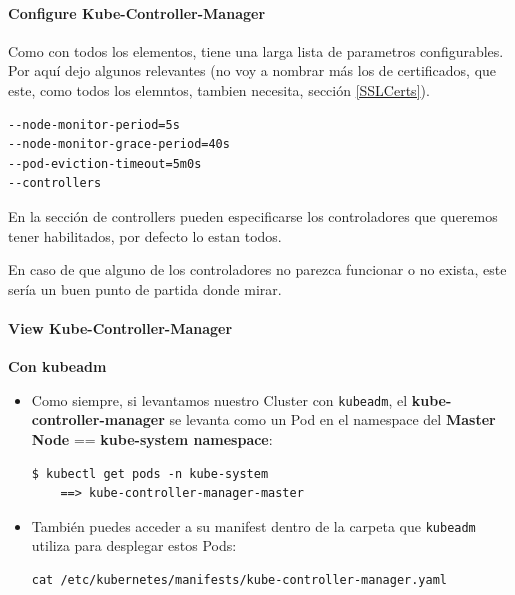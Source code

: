 \documentclass{article}
\newenvironment{codetemplate}[1][]{%
  \mybasecolorbox[#1]
  \itshape
}{%
  \endmybasecolorbox
}
\begin{document}
\paragraph{Configure Kube-Controller-Manager}

Como con todos los elementos, tiene una larga lista de parametros configurables. Por aquí dejo algunos relevantes (no voy a nombrar más los de certificados, que este, como todos los elemntos, tambien necesita, sección \ref{SSLCerts}).

\begin{codetemplate}{}
\begin{verbatim}
--node-monitor-period=5s
--node-monitor-grace-period=40s
--pod-eviction-timeout=5m0s
--controllers
\end{verbatim}
\end{codetemplate}

En la sección de controllers pueden especificarse los controladores que queremos tener habilitados, por defecto lo estan todos.

En caso de que alguno de los controladores no parezca funcionar o no exista, este sería un buen punto de partida donde mirar.

\paragraph{View Kube-Controller-Manager}

\textbf{Con kubeadm}

\begin{itemize}
    \item Como siempre, si levantamos nuestro Cluster con \verb|kubeadm|, el \textbf{kube-controller-manager} se levanta como un Pod en el namespace del \textbf{Master Node} == \textbf{kube-system namespace}:
\begin{codetemplate}{}
\begin{verbatim}
$ kubectl get pods -n kube-system
    ==> kube-controller-manager-master
\end{verbatim}
\end{codetemplate}

    \item También puedes acceder a su manifest dentro de la carpeta que \verb|kubeadm| utiliza para desplegar estos Pods:
\begin{codetemplate}{}
\begin{verbatim}
cat /etc/kubernetes/manifests/kube-controller-manager.yaml
\end{verbatim}
\end{codetemplate}
\end{itemize}
\end{document}
